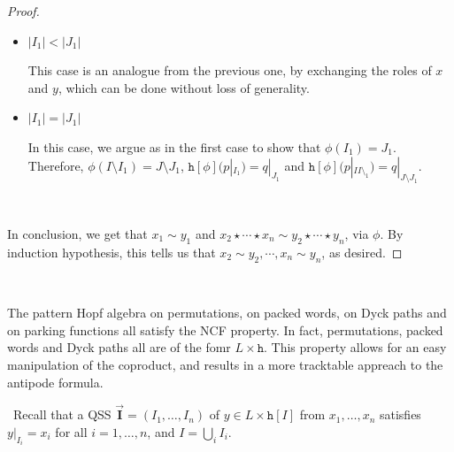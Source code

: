 \documentclass[12pt, reqno]{amsart}
\theoremstyle{definition}
\newcommand{\III}{\vec{\mathbf{I}}}
\begin{document}
\begin{proof}
\begin{itemize}
    \item $|I_1| < |J_1|$

This case is an analogue from the previous one, by exchanging the roles of $x$ and $y$, which can be done without loss of generality.
    
    \item $|I_1| = |J_1|$

In this case, we argue as in the first case to show that $\phi(I_1) = J_1$.
Therefore,  $\phi(I\setminus I_1) = J \setminus  J_1$, $ \mathtt{h}[\phi] (p|_{I_1}) = q|_{J_1} $ and $ \mathtt{h}[\phi] (p|_{II \setminus_1}) = q|_{J \setminus J_1} $.
\end{itemize}

\

In conclusion, we get that $x_1 \sim y_1$ and $x_2 \star \cdots \star x_n \sim y_2 \star \cdots \star y_n$, via $\phi$.
By induction hypothesis, this tells us that $x_2 \sim y_2, \cdots , x_n \sim y_n$, as desired.
\end{proof}

\

The pattern Hopf algebra on permutations, on packed words, on Dyck paths and on parking functions all satisfy the NCF property.
In fact, permutations, packed words and Dyck paths all are of the fomr $L \times \mathtt{h}$.
This property allows for an easy manipulation of the coproduct, and results in a more tracktable appreach to the antipode formula.

\
Recall that a QSS $\III = (I_1, \dots , I_n)$ of $y\in L\times \mathtt{h}[I]$ from $x_1, \dots, x_n$ satisfies $y|_{I_i} = x_i$ for all $i = 1, \dots , n$, and $I = \bigcup_i I_i$.
\end{document}
